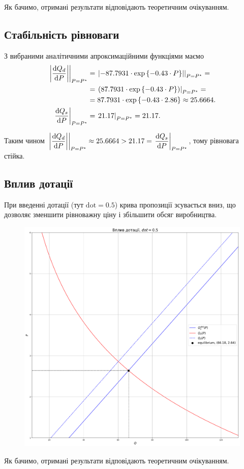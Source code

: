 Як бачимо, отримані результати відповідають теоретичним очікуванням.

\subsection{Стабільність рівноваги}

З вибраними аналітичними апроксимаційними функціями маємо 
\begin{align*} 
	\left. \left| \dfrac{\mathop{}\!\mathrm{d} Q_d}{\mathop{}\!\mathrm{d} P} \right| \right|_{P = P^\star} &= \left. \left| -87.7931 \cdot \exp\left\{-0.43 \cdot P\right\} \right| \right|_{P = P^\star} = \\ 
	&= \left. \left( 87.7931 \cdot \exp\left\{-0.43 \cdot P\right\} \right) \right|_{P = P^\star} = \\ 
	&= 87.7931 \cdot \exp\left\{-0.43 \cdot 2.86\right\} \approx 25.6664. \\
	\left. \dfrac{\mathop{}\!\mathrm{d} Q_s}{\mathop{}\!\mathrm{d} P} \right|_{P = P^\star} &= \left. 21.17 \right|_{P = P^\star} = 21.17.
\end{align*}

Таким чином $\left. \left| \dfrac{\mathop{}\!\mathrm{d} Q_d}{\mathop{}\!\mathrm{d} P} \right| \right|_{P = P^\star} \approx 25.6664 > 21.17 = \left. \dfrac{\mathop{}\!\mathrm{d} Q_s}{\mathop{}\!\mathrm{d} P} \right|_{P = P^\star}$, тому рівновага стійка.

\subsection{Вплив дотації}

При введенні дотації (тут $\text{dot} = 0.5$) крива пропозиції зсувається вниз, що дозволяє зменшити рівноважну ціну і збільшити обсяг виробництва.

\begin{figure}[H]
	\centering
	\includegraphics[width=\textwidth]{dotation.png}
\end{figure}

Як бачимо, отримані результати відповідають теоретичним очікуванням.

